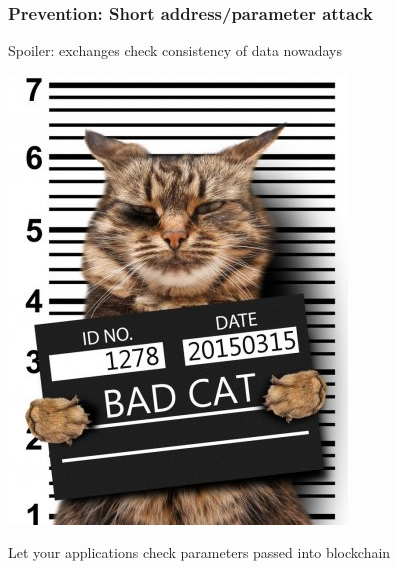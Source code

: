 \documentclass[11pt]{beamer}  %
\begin{document}
\begin{frame}\frametitle{Prevention: Short address/parameter attack}

  \begin{greenbox}{Spoiler: exchanges check consistency of data nowadays}
    \begin{center}
      \includegraphics[scale=0.32,clip=false]{pictures/cat-jail.jpg}
    \end{center}
  \end{greenbox}

  \bigskip

  \begin{center}
    Let your applications check parameters passed into blockchain
  \end{center}

\end{frame}
\end{document}
